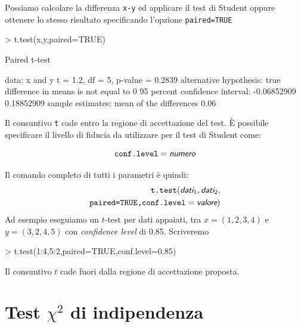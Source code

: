 \documentclass[onecolumn,11pt]{book}
\newcommand{\varia}[1]{\textsl{\textsf{#1}}}
\begin{document}
Possiamo calcolare la differenza \texttt{x-y} ed applicare il test di Student oppure ottenere lo stesso risultato specificando l'opzione \texttt{paired=TRUE}
\begin{Schunk}
\begin{Sinput}
>  t.test(x,y,paired=TRUE)
\end{Sinput}
\begin{Soutput}
	Paired t-test

data:  x and y
t = 1.2, df = 5, p-value = 0.2839
alternative hypothesis: true difference in means is not equal to 0
95 percent confidence interval:
 -0.06852909  0.18852909
sample estimates:
mean of the differences 
                   0.06 
\end{Soutput}
\end{Schunk}

Il consuntivo   \texttt{t} cade entro la regione di accettazione del test.
\`E  possibile specificare il livello di fiducia da utilizzare per il test di Student come: 

$$\texttt{conf.level}=\varia{numero}$$

Il comando completo di tutti i parametri  \`e quindi:
\begin{eqnarray*}
\texttt{t.test}(\varia{dati}_1,\varia{dati}_2,
\\
\texttt{paired=TRUE,conf.level}=\varia{valore})
\end{eqnarray*}
Ad esempio eseguiamo un $t$-test per dati appaiati, tra $x=(1,2,3,4)$ e $y=(3,2,4,5)$ con {\it confidence level} di 0.85. Scriveremo
\begin{Schunk}
\begin{Sinput}
> t.test(1:4,5:2,paired=TRUE,conf.level=0.85)
\end{Sinput}
\end{Schunk}
 Il consuntivo $t$ cade fuori dalla regione di accettazione proposta. 
 
 \section{Test $\chi^2$  di indipendenza}
\end{document}
